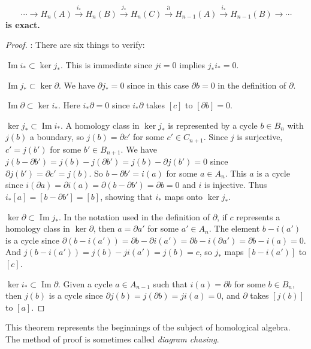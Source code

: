 \begin{theorem}
\label{thm:long-exact-sequence-pair}
\[
\cdots \to H_n(A) \xrightarrow{i_*} H_n(B) \xrightarrow{j_*} H_n(C) \xrightarrow{\partial} H_{n-1}(A) \xrightarrow{i_*} H_{n-1}(B) \to \cdots
\]
\textbf{is exact.}
\end{theorem}
\begin{proof}
: There are six things to verify:

$\operatorname{Im}i_* \subset \ker j_*$. This is immediate since $ji = 0$ implies $j_* i_* = 0$.

$\operatorname{Im}j_* \subset \ker\partial$. We have $\partial j_* = 0$ since in this case $\partial b = 0$ in the definition of $\partial$.

$\operatorname{Im}\partial \subset \ker i_*$. Here $i_*\partial = 0$ since $i_*\partial$ takes $[c]$ to $[\partial b] = 0$.

$\ker j_* \subset \operatorname{Im}i_*$. A homology class in $\ker j_*$ is represented by a cycle $b \in B_n$ with $j(b)$ a boundary, so $j(b) = \partial c'$ for some $c' \in C_{n+1}$. Since $j$ is surjective, $c' = j(b')$ for some $b' \in B_{n+1}$. We have $j(b - \partial b') = j(b) - j(\partial b') = j(b) - \partial j(b') = 0$ since $\partial j(b') = \partial c' = j(b)$. So $b - \partial b' = i(a)$ for some $a \in A_n$. This $a$ is a cycle since $i(\partial a) = \partial i(a) = \partial(b - \partial b') = \partial b = 0$ and $i$ is injective. Thus $i_*[a] = [b - \partial b'] = [b]$, showing that $i_*$ maps onto $\ker j_*$.

$\ker\partial \subset \operatorname{Im}j_*$. In the notation used in the definition of $\partial$, if $c$ represents a homology class in $\ker\partial$, then $a = \partial a'$ for some $a' \in A_n$. The element $b - i(a')$ is a cycle since $\partial(b - i(a')) = \partial b - \partial i(a') = \partial b - i(\partial a') = \partial b - i(a) = 0$. And $j(b - i(a')) = j(b) - ji(a') = j(b) = c$, so $j_*$ maps $[b - i(a')]$ to $[c]$.

$\ker i_* \subset \operatorname{Im}\partial$. Given a cycle $a \in A_{n-1}$ such that $i(a) = \partial b$ for some $b \in B_n$, then $j(b)$ is a cycle since $\partial j(b) = j(\partial b) = ji(a) = 0$, and $\partial$ takes $[j(b)]$ to $[a]$.
\end{proof}
This theorem represents the beginnings of the subject of homological algebra. The method of proof is sometimes called \textit{diagram chasing}.

